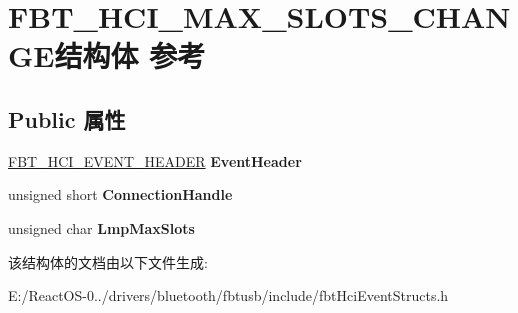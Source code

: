 \hypertarget{struct_f_b_t___h_c_i___m_a_x___s_l_o_t_s___c_h_a_n_g_e}{}\section{F\+B\+T\+\_\+\+H\+C\+I\+\_\+\+M\+A\+X\+\_\+\+S\+L\+O\+T\+S\+\_\+\+C\+H\+A\+N\+G\+E结构体 参考}
\label{struct_f_b_t___h_c_i___m_a_x___s_l_o_t_s___c_h_a_n_g_e}
\subsection*{Public 属性}
\begin{DoxyCompactItemize}
\item 
\mbox{\label{struct_f_b_t___h_c_i___m_a_x___s_l_o_t_s___c_h_a_n_g_e_a20e761d25ab708984c160ac017f86fb4}} 
\hyperlink{struct_f_b_t___h_c_i___e_v_e_n_t___h_e_a_d_e_r}{F\+B\+T\+\_\+\+H\+C\+I\+\_\+\+E\+V\+E\+N\+T\+\_\+\+H\+E\+A\+D\+ER} {\bfseries Event\+Header}
\item 
\mbox{\label{struct_f_b_t___h_c_i___m_a_x___s_l_o_t_s___c_h_a_n_g_e_ae25a10ba75f3b4a576265f181c640b15}} 
unsigned short {\bfseries Connection\+Handle}
\item 
\mbox{\label{struct_f_b_t___h_c_i___m_a_x___s_l_o_t_s___c_h_a_n_g_e_a0cec2c3a3d61db54e21f9b1fca5172b7}} 
unsigned char {\bfseries Lmp\+Max\+Slots}
\end{DoxyCompactItemize}


该结构体的文档由以下文件生成\+:\begin{DoxyCompactItemize}
\item 
E\+:/\+React\+O\+S-\/0../drivers/bluetooth/fbtusb/include/fbt\+Hci\+Event\+Structs.\+h\end{DoxyCompactItemize}
